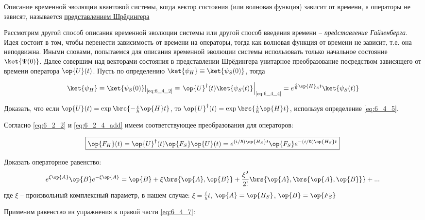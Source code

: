 \begin{defn}
Описание временной эволюции квантовой системы, когда вектор состояния (или волновая функция) зависит от времени, а операторы не зависят, называется \underline{представлением Шрёдингера}
\end{defn}

Рассмотрим другой способ описания временной эволюции системы или другой способ введения времени -- {\em представление Гайзенберга}. Идея состоит в том, чтобы перенести зависимость от времени на операторы, тогда как волновая функция от времени не зависит, т.е. она неподвижна. Иными словами, попытаемся для описания временной эволюции системы использовать только начальное состояние $\ket{\Psi(0)}$. Далее совершим над векторами состояния в представлении Шрёдингера унитарное преобразование посредством зависящего от времени оператора $\op{U}(t)$. Пусть по определению $\ket{\psi_H} \equiv \ket{\psi_S(0)}$, тогда

\begin{equation}
\label{eq:6_4_6}
	\left. \ket{\psi_H} \equiv \ket{\psi_S(0)} \right|_\text{\eqref{eq:6_4_2}} \equiv 
	\left.  \op{U}^\dag(t) \ket{\psi_S(t)} \right|_\text{\eqref{eq:6_4_4}} =
	e^{\frac{i}{\hbar}\op{H}_St} \ket{\psi_S(t)}
\end{equation}

\begin{excr}
Доказать, что если $\op{U}(t)=\exp\brc{-\frac{i}{\hbar}\op{H}t}$, то $\op{U}^\dag(t) = \exp\brc{\frac{i}{\hbar}\op{H}t}$, используя определение \eqref{eq:6_4_5}.
\end{excr}

Согласно \eqref{eq:6_2_2} и \eqref{eq:6_2_4_add} имеем соответствующее преобразования для операторов:

\begin{equation}
\label{eq:6_4_7}
\boxed{
	\op{F_H}(t) = \op{U}^\dag(t) \op{F_S} \op{U}(t) = e^{(i/\hbar) \op{H_S}t} \op{F_S} e^{-(i/\hbar) \op{H_S}t}
}
\end{equation}

\begin{excr}
Доказать операторное равенство:
$$
e^{\xi \op{A}} \op{B} e^{-\xi \op{A}} = \op{B} + \xi \brs{\op{A}, \op{B}} + \frac{\xi^2}{2!} \brs{\op{A}, \brs{\op{A}, \op{B}}} + ...
$$
где $\xi$ -- произвольный комплексный параметр, в нашем случае: $\xi = \frac{i}{\hbar} t$, $\op{A} = \op{H_S}$, $\op{B} = \op{F_S}$
\end{excr}

Применим равенство из упражнения к правой части \eqref{eq:6_4_7}:

